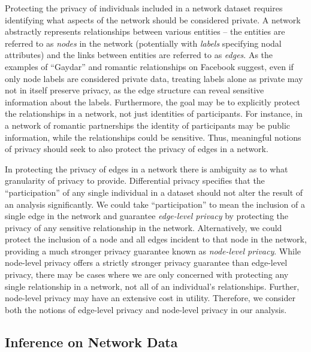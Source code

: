 Protecting the privacy of individuals included in a network dataset requires identifying what aspects of the network should be considered private. A network abstractly represents relationships between various entities -- the entities are referred to as \emph{nodes} in the network (potentially with \emph{labels} specifying nodal attributes) and the links between entities are referred to as \emph{edges}. As the examples of ``Gaydar'' and romantic relationships on Facebook suggest, even if only node labels are considered private data, treating labels alone as private may not in itself preserve privacy, as the edge structure can reveal sensitive information about the labels. Furthermore, the goal may be to explicitly protect the relationships in a network, not just identities of participants. For instance, in a network of romantic partnerships the identity of participants may be public information, while the relationships could be sensitive. Thus, meaningful notions of privacy should seek to also protect the privacy of edges in a network.

In protecting the privacy of edges in a network there is ambiguity as to what granularity of privacy to provide. Differential privacy specifies that the ``participation'' of any single individual in a dataset should not alter the result of an analysis significantly. We could take ``participation'' to mean the inclusion of a single edge in the network and guarantee \emph{edge-level privacy} by protecting the privacy of any sensitive relationship in the network. Alternatively, we could protect the inclusion of a node and all edges incident to that node in the network, providing a much stronger privacy guarantee known as \emph{node-level privacy}. While node-level privacy offers a strictly stronger privacy guarantee than edge-level privacy, there may be cases where we are only concerned with protecting any single relationship in a network, not all of an individual's relationships. Further, node-level privacy may have an extensive cost in utility. Therefore, we consider both the notions of edge-level privacy and node-level privacy in our analysis.

\subsection{Inference on Network Data}

